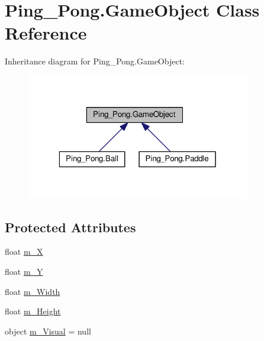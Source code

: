\hypertarget{class_ping___pong_1_1_game_object}{\section{Ping\-\_\-\-Pong.\-Game\-Object Class Reference}
\label{class_ping___pong_1_1_game_object}
}


Inheritance diagram for Ping\-\_\-\-Pong.\-Game\-Object\-:
\nopagebreak
\begin{figure}[H]
\begin{center}
\leavevmode
\includegraphics[width=277pt]{class_ping___pong_1_1_game_object__inherit__graph}
\end{center}
\end{figure}
\subsection*{Protected Attributes}
\begin{DoxyCompactItemize}
\item 
float \hyperlink{class_ping___pong_1_1_game_object_a292627bfcfe03c2f5a1dc403faa37690}{m\-\_\-\-X}
\item 
float \hyperlink{class_ping___pong_1_1_game_object_a29466cb57b6ac26e58052b2517083745}{m\-\_\-\-Y}
\item 
float \hyperlink{class_ping___pong_1_1_game_object_ac75ebfdec034a75ed71dbf91eface23f}{m\-\_\-\-Width}
\item 
float \hyperlink{class_ping___pong_1_1_game_object_a22de23272c1b02fb7bf7b13da7804afb}{m\-\_\-\-Height}
\item 
object \hyperlink{class_ping___pong_1_1_game_object_a5009be35d8fba10d72173a954caef57c}{m\-\_\-\-Visual} = null
\end{DoxyCompactItemize}
